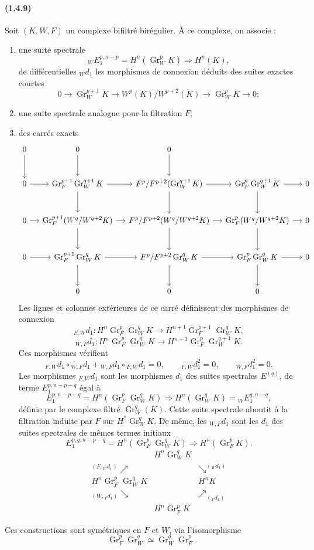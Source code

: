 \documentclass[10pt]{article}
\newcommand{\Gr}{\operatorname{Gr}}
\begin{document}
\paragraph{(1.4.9)} Soit $(K,W,F)$ un complexe bifiltré birégulier. À ce complexe, on associe :
\begin{enumerate}[label=\alph*)]
\item une suite spectrale
\[
{}_WE_1^{p,n-p}=H^n(\Gr_W^pK)\Rightarrow H^n(K),
\]
de différentielles ${}_Wd_1$ les morphismes de connexion déduits des suites exactes courtes
\[
0\to\Gr_W^{p+1}K\to W^p(K)/W^{p+2}(K)\to\Gr_W^pK\to0;
\]
\item une suite spectrale analogue pour la filtration $F$;
\item des carrés exacts
\[
\begin{tikzcd}[column sep=small,row sep=large]
0 \arrow[d] & 0 \arrow[d] & 0 \arrow[d] & \\
0 \arrow[r] & \Gr_F^{p+1}\Gr_W^{q+1}K \arrow[r] \arrow[d] & F^p/F^{p+2}(\Gr_W^{q+1}K) \arrow[r] \arrow[d] & \Gr_F^{p}\Gr_W^{q+1}K \arrow[r] \arrow[d] & 0\\
0 \arrow[r] & \Gr_F^{p+1}(W^q/W^{q+2}K) \arrow[r] \arrow[d] & F^p/F^{p+2}(W^q/W^{q+2}K) \arrow[r] \arrow[d] & \Gr_F^{p}(W^q/W^{q+2}K) \arrow[r] \arrow[d] & 0\\
0 \arrow[r] & \Gr_F^{p+1}\Gr_W^{q}K \arrow[r] \arrow[d] & F^p/F^{p+2}\Gr_W^{q}K \arrow[r] \arrow[d] & \Gr_F^{p}\Gr_W^{q}K \arrow[r] \arrow[d] & 0\\
& 0 & 0 & 0
\end{tikzcd}
\]
Les lignes et colonnes extérieures de ce carré définissent des morphismes de connexion
\[
{}_{F,W}d_1:H^n\Gr_F^p\Gr_W^qK\longrightarrow H^{n+1}\Gr_F^{p+1}\Gr_W^qK,
\]
\[
{}_{W,F}d_1:H^n\Gr_F^p\Gr_W^qK\longrightarrow H^{n+1}\Gr_F^p\Gr_W^{q+1}K.
\]
Ces morphismes vérifient
\[
{}_{F,W}d_1\circ{}_{W,F}d_1+{}_{W,F}d_1\circ{}_{F,W}d_1=0,
\qquad
{}_{F,W}d_1^2=0,
\qquad
{}_{W,F}d_1^2=0.
\]
Les morphismes ${}_{F,W}d_1$ sont les morphismes $d_1$ des suites spectrales $E^{(q)}$, de terme $E_1^{p,n-p-q}$ égal à
\[
\tag{1.4.9.1}
E_1^{p,n-p-q}=H^n(\Gr_F^p\Gr_W^qK)\Rightarrow H^n(\Gr_W^qK)={}_WE_1^{q,n-q},
\]
définie par le complexe filtré $\Gr_W^q(K)$. Cette suite spectrale aboutit à la filtration induite par $F$ sur $H^*\Gr_W^qK$. De même, les ${}_{W,F}d_1$ sont les $d_1$ des suites spectrales de mêmes termes initiaux
\[
\tag{1.4.9.2}
E_1^{p,q,n-p-q}=H^n(\Gr_F^p\Gr_W^qK)\Rightarrow H^n(\Gr_F^pK).
\]
\[
\begin{array}{ccc}
& H^n\Gr_W^qK & \\[0.4em]
{}^{(F,{}_Wd_1)}\nearrow & & \searrow^{({}_Wd_1)}\\[0.4em]
H^n\Gr_F^p\Gr_W^qK & & H^nK\\[0.4em]
{}_{(W,{}_Fd_1)}\searrow & & \nearrow_{({}_Fd_1)}\\[0.4em]
& H^n\Gr_F^pK &
\end{array}
\]
\end{enumerate}
Ces constructions sont symétriques en $F$ et $W$, via l'isomorphisme
\[
\Gr_F^p\Gr_W^q\simeq\Gr_W^q\Gr_F^p.
\]
\end{document}
